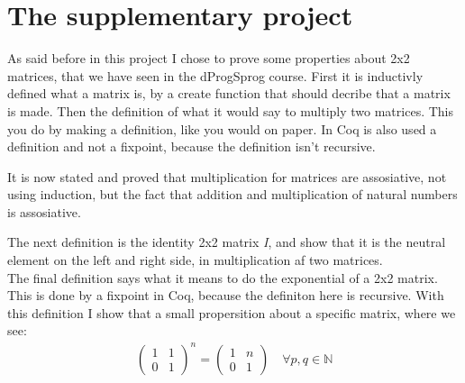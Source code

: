 \documentclass[a4paper,10p,danish]{article}
\begin{document}
\section{The supplementary project}
As said before in this project I chose to prove some properties about 2x2 matrices, that we have seen in the dProgSprog course.
First it is inductivly defined what a matrix is, by a create function that should decribe that a matrix is made. Then the definition of what it would say to multiply two matrices. This you do by making a definition, like you would on paper. In Coq is also used a definition and not a fixpoint, because the definition isn't recursive. 

It is now stated and proved that multiplication for matrices are assosiative, not using induction, but the fact that addition and multiplication of natural numbers is assosiative. 


The next definition is the identity 2x2 matrix \textit{I}, and show that it is the neutral element on the left and right side, in multiplication af two matrices. \\

The final definition says what it means to do the exponential of a 2x2 matrix. This is done by a fixpoint in Coq, because the definiton here is recursive. With this definition I show that a small propersition about a specific matrix, where we see:
\begin{align*}
\begin{pmatrix}
1 & 1\\
0 & 1
\end{pmatrix}^n = 
\begin{pmatrix}
1 & n\\
0 & 1
\end{pmatrix}
\quad \forall p,q \in \mathbb{N}
\end{align*}
\end{document}
